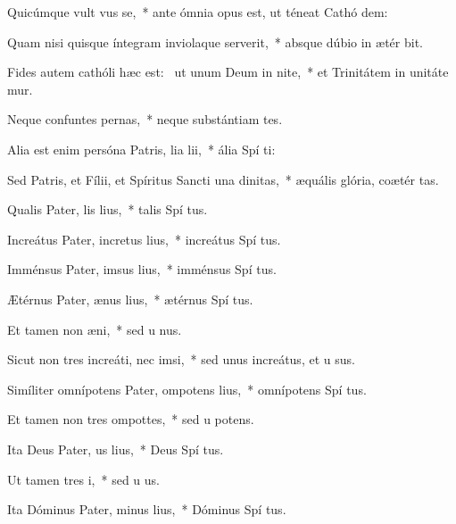 \item Quicúmque vult vus se,~* ante ómnia opus est, ut téneat Cathó dem:
\item Quam nisi quisque íntegram inviolaque serverit,~* absque dúbio in ætér bit.
\item Fides autem cathóli hæc est:~\pscross{} ut unum Deum in nite,~* et Trinitátem in unitáte mur.
\item Neque confuntes pernas,~* neque substántiam tes.
\item Alia est enim persóna Patris, lia lii,~* ália Spí ti:
\item Sed Patris, et Fílii, et Spíritus Sancti una  dinitas,~* æquális glória, coætér tas.
\item Qualis Pater, lis lius,~* talis Spí tus.
\item Increátus Pater, incretus lius,~* increátus Spí tus.
\item Imménsus Pater, imsus lius,~* imménsus Spí tus.
\item Ætérnus Pater, ænus lius,~* ætérnus Spí tus.
\item Et tamen non  æni,~* sed u nus.
\item Sicut non tres increáti, nec  imsi,~* sed unus increátus, et u sus.
\item Simíliter omnípotens Pater, ompotens lius,~* omnípotens Spí tus.
\item Et tamen non tres ompottes,~* sed u potens.
\item Ita Deus Pater, us lius,~* Deus Spí tus.
\item Ut tamen  tres i,~* sed u  us.
\item Ita Dóminus Pater, minus lius,~* Dóminus Spí tus.
